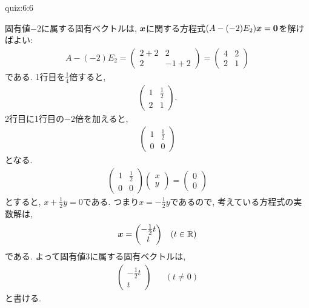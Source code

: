 \begin{answerof}{quiz:6:6}
  
  固有値$-2$に属する固有ベクトルは,
  $\boldsymbol{x}$に関する方程式$(A-(-2)E_2)\boldsymbol{x}=\boldsymbol{0}$を解けばよい:
  \begin{align*}
    A-(-2)E_2=
    \begin{pmatrix}
      2+2&2\\2&-1+2
    \end{pmatrix}
    =
    \begin{pmatrix}
      4&2\\2&1
    \end{pmatrix}
  \end{align*}
  である.  1行目を$\frac{1}{4}$倍すると,
  \begin{align*}
    \begin{pmatrix}
      1&\frac{1}{2}\\2&1
    \end{pmatrix}.
  \end{align*}
  2行目に1行目の$-2$倍を加えると,
  \begin{align*}
    \begin{pmatrix}
      1&\frac{1}{2}\\0&0
    \end{pmatrix}
  \end{align*}
  となる.
  \begin{align*}
    \begin{pmatrix}
      1&\frac{1}{2}\\0&0
    \end{pmatrix}
    \begin{pmatrix}
      x\\y
    \end{pmatrix}=
    \begin{pmatrix}
      0\\0
    \end{pmatrix}
  \end{align*}
  とすると, $x+\frac{1}{2}y=0$である.
  つまり$x=-\frac{1}{2}y$であるので, 考えている方程式の実数解は,
  \begin{align*}
    \boldsymbol{x}=
    \begin{pmatrix}
      -\frac{1}{2}t\\t
    \end{pmatrix}&&(t\in\mathbb{R})
  \end{align*}
  である.
  よって固有値$3$に属する固有ベクトルは,
  \begin{align*}
    \begin{pmatrix}
      -\frac{1}{2}t\\t
    \end{pmatrix}&&(t\neq 0)
  \end{align*}
  と書ける.


\end{answerof}
